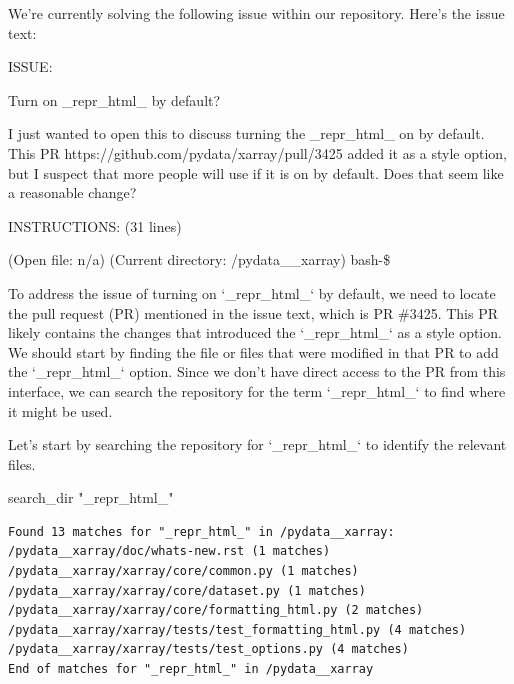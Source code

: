 {
\captionsetup{type=figure}
\begin{issuebox}We're currently solving the following issue within our repository. Here's the issue text:

ISSUE:

Turn on \_repr\_html\_ by default?

I just wanted to open this to discuss turning the \_repr\_html\_ on by default. This PR https://github.com/pydata/xarray/pull/3425 added it as a style option, but I suspect that more people will use if it is on by default. Does that seem like a reasonable change?









INSTRUCTIONS: (31 lines)

\begin{CodeVerbatim}[breaklines=true, breakanywhere=true]
(Open file: n/a)
(Current directory: /pydata__xarray)
bash-\$
\end{CodeVerbatim}
\end{issuebox}
\begin{agentbox}
To address the issue of turning on `\_repr\_html\_` by default, we need to locate the pull request (PR) mentioned in the issue text, which is PR \#3425. This PR likely contains the changes that introduced the `\_repr\_html\_` as a style option. We should start by finding the file or files that were modified in that PR to add the `\_repr\_html\_` option. Since we don't have direct access to the PR from this interface, we can search the repository for the term `\_repr\_html\_` to find where it might be used.



Let's start by searching the repository for `\_repr\_html\_` to identify the relevant files.



\hrulefill
\begin{CodeVerbatim}[breaklines=true, breakanywhere=true]
search_dir "_repr_html_"
\end{CodeVerbatim}
\end{agentbox}
\begin{observationbox}\begin{Verbatim}[breaklines=true, breakanywhere=true]
Found 13 matches for "_repr_html_" in /pydata__xarray:
/pydata__xarray/doc/whats-new.rst (1 matches)
/pydata__xarray/xarray/core/common.py (1 matches)
/pydata__xarray/xarray/core/dataset.py (1 matches)
/pydata__xarray/xarray/core/formatting_html.py (2 matches)
/pydata__xarray/xarray/tests/test_formatting_html.py (4 matches)
/pydata__xarray/xarray/tests/test_options.py (4 matches)
End of matches for "_repr_html_" in /pydata__xarray


\end{Verbatim}
\end{observationbox}}
